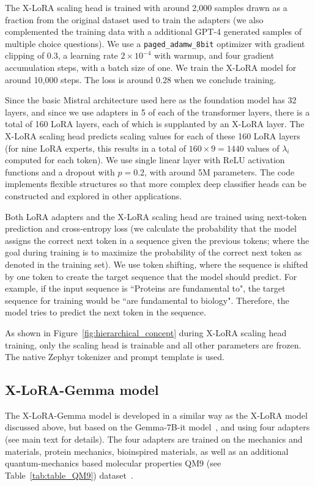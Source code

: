 The X-LoRA scaling head is trained with around 2,000 samples drawn as a fraction from the original dataset used to train the adapters (we also complemented the training data with a additional GPT-4 generated samples of multiple choice questions). We use a \texttt{paged\_adamw\_8bit} optimizer with gradient clipping of 0.3, a learning rate $2\times 10^{-4}$ with warmup, and four gradient accumulation steps, with a batch size of one. We train the X-LoRA model for around 10,000 steps. The loss is around 0.28 when we conclude training. 

Since the basic Mistral architecture used here as the foundation model has 32 layers, and since we use adapters in 5 of each of the transformer layers, there is a total of 160 LoRA layers, each of which is supplanted by an X-LoRA layer. The X-LoRA scaling head predicts scaling values for each of these 160 LoRA layers (for nine LoRA experts, this results in a total of $160\times 9=1440$ values of $\lambda_i$ computed for each token). We use single linear layer with ReLU activation functions and a dropout with $p=0.2$, with around 5M parameters. The code implements flexible structures so that more complex deep classifier heads can be constructed and explored in other applications. 

Both LoRA adapters and the X-LoRA scaling head are trained using next-token prediction and cross-entropy loss (we calculate the probability that the model assigns the correct next token in a sequence given the previous tokens; where the goal during training is to maximize the probability of the correct next token as denoted in the training set). We use token shifting, where the sequence is  shifted by one token to create the target sequence that the model should predict. For example, if the input sequence is ``Proteins are fundamental to", the target sequence for training would be ``are fundamental to biology". Therefore, the model tries to predict the next token in the sequence.

As shown in Figure~\ref{fig:hierarchical_concept} during X-LoRA scaling head training, only the scaling head is trainable and all other parameters are frozen. The native Zephyr tokenizer and prompt template is used. 


\subsection{X-LoRA-Gemma model}
The X-LoRA-Gemma model is developed in a similar way as the X-LoRA model discussed above, but based on the Gemma-7B-it model~\cite{Google/gemma-7b-itFace}, and using four adapters (see main text for details). The four adapters are trained on the mechanics and materials, protein mechanics, bioinspired materials, as well as an additional quantum-mechanics based molecular properties QM9 (see Table~\ref{tab:table_QM9}) dataset~\cite{Ruddigkeit2012EnumerationGDB-17,Ramakrishnan2015ElectronicSpace}.

